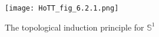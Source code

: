 \documentclass[12pt]{article}
\newcommand{\base}{\ensuremath{\mathsf{base}}\xspace}
\newcommand{\lloop}{\ensuremath{\mathsf{loop}}\xspace}
\newcommand{\Sn}{\mathbb{S}}
\begin{document}
\begin{figure}
  \centering
\texttt{[image: HoTT\_fig\_6.2.1.png]}
  \caption{The topological induction principle for $\Sn^1$}
  \label{fig:topS1ind}
\end{figure}
\end{document}
